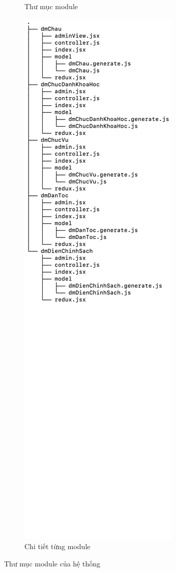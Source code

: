 \begin{figure}[H]
\begin{subfigure}[b]{0.4\linewidth}
        \caption{Thư mục module}
    \end{subfigure}
    \begin{subfigure}[b]{0.4\linewidth}
        \includegraphics[width=\linewidth]{img/moduleDetail.png}
        \caption{Chi tiết từng module}
    \end{subfigure}
    \caption{Thư mục module của hệ thống}
\end{figure}
